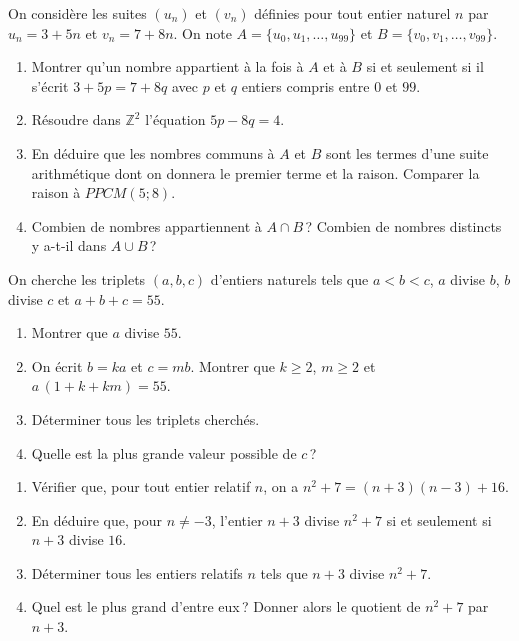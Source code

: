 \begin{exo}\label{exo:arith-36}
      On consid\`ere les suites $(u_n)$ et $(v_n)$ d\'efinies pour tout entier naturel $n$ par
      $u_n = 3 + 5n$ et $v_n = 7 + 8n$.
      On note $A = \{u_0, u_1, \ldots, u_{99}\}$ et $B = \{v_0, v_1, \ldots, v_{99}\}$.
      \begin{enumerate}
            \item Montrer qu'un nombre appartient \`a la fois \`a $A$ et \`a $B$ si et seulement si il s'\'ecrit
                  $3 + 5p = 7 + 8q$ avec $p$ et $q$ entiers compris entre $0$ et $99$.
            \item R\'esoudre dans $\mathbb{Z}^2$ l'\'equation $5p - 8q = 4$.
            \item En d\'eduire que les nombres communs \`a $A$ et $B$ sont les termes d'une suite arithm\'etique
                  dont on donnera le premier terme et la raison. Comparer la raison \`a $PPCM(5;8)$.
            \item Combien de nombres appartiennent \`a $A \cap B$\,?
                  Combien de nombres distincts y a-t-il dans $A \cup B$\,?
      \end{enumerate}
\end{exo}

\begin{exo}\label{exo:arith-37}
      On cherche les triplets $(a, b, c)$ d'entiers naturels tels que
      $a < b < c$, $a$ divise $b$, $b$ divise $c$ et $a + b + c = 55$.
      \begin{enumerate}
            \item Montrer que $a$ divise $55$.
            \item On \'ecrit $b = k a$ et $c = m b$. Montrer que $k \geq 2$, $m \geq 2$ et $a\,(1 + k + k m) = 55$.
            \item D\'eterminer tous les triplets cherch\'es.
            \item Quelle est la plus grande valeur possible de $c$\,?
      \end{enumerate}
\end{exo}

\begin{exo}\label{exo:arith-38}
      \begin{enumerate}
            \item V\'erifier que, pour tout entier relatif $n$, on a $n^2 + 7 = (n+3)(n-3) + 16$.
            \item En d\'eduire que, pour $n \neq -3$, l'entier $n+3$ divise $n^2 + 7$ si et seulement si $n + 3$ divise $16$.
            \item D\'eterminer tous les entiers relatifs $n$ tels que $n + 3$ divise $n^2 + 7$.
            \item Quel est le plus grand d'entre eux\,? Donner alors le quotient de $n^2 + 7$ par $n + 3$.
      \end{enumerate}
\end{exo}

